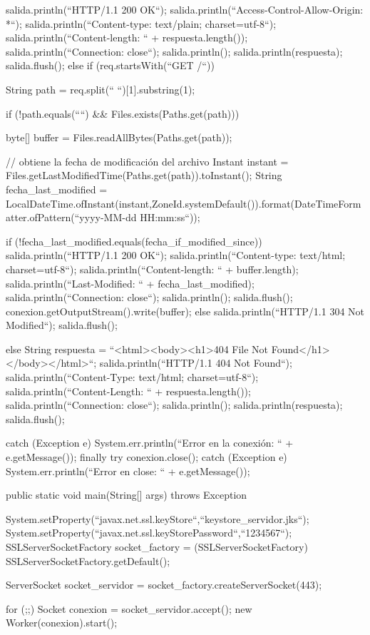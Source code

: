 \begin{SourceCode}
{{{{{          salida.println(``HTTP/1.1 200 OK``);
          salida.println(``Access-Control-Allow-Origin: *``);
          salida.println(``Content-type: text/plain; charset=utf-8``);
          salida.println(``Content-length: `` + respuesta.length());
          salida.println(``Connection: close``);
          salida.println();
          salida.println(respuesta);
          salida.flush();
        }
        else
        if (req.startsWith(``GET /``))
        {
          String path = req.split(`` ``)[1].substring(1);

          if (!path.equals(````) && Files.exists(Paths.get(path)))
          {
            byte[] buffer = Files.readAllBytes(Paths.get(path));

            // obtiene la fecha de modificación del archivo
            Instant instant = Files.getLastModifiedTime(Paths.get(path)).toInstant();
            String fecha_last_modified = LocalDateTime.ofInstant(instant,ZoneId.systemDefault()).format(DateTimeFormatter.ofPattern(``yyyy-MM-dd HH:mm:ss``));

            if (!fecha_last_modified.equals(fecha_if_modified_since))
            {
              salida.println(``HTTP/1.1 200 OK``);
              salida.println(``Content-type: text/html; charset=utf-8``);
              salida.println(``Content-length: `` + buffer.length);
              salida.println(``Last-Modified: `` + fecha_last_modified);
              salida.println(``Connection: close``);
              salida.println();
              salida.flush();
	            conexion.getOutputStream().write(buffer);
            }
            else
            {
              salida.println(``HTTP/1.1 304 Not Modified``);
              salida.flush();
            }
          }
          else
          {
            String respuesta = ``<html><body><h1>404 File Not Found</h1></body></html>``;
            salida.println(``HTTP/1.1 404 Not Found``);
            salida.println(``Content-Type: text/html; charset=utf-8``);
            salida.println(``Content-Length: `` + respuesta.length());
            salida.println(``Connection: close``);
            salida.println();
            salida.println(respuesta);
            salida.flush();
          }
        }
      }
      catch (Exception e)
      {
        System.err.println(``Error en la conexión: `` + e.getMessage());
      }
      finally
      {
        try
        {
          conexion.close();
        }
        catch (Exception e)
        {
          System.err.println(``Error en close: `` + e.getMessage());
        }
      }
    }
  }

  public static void main(String[] args) throws Exception
  {
    System.setProperty(``javax.net.ssl.keyStore``,``keystore_servidor.jks``);
    System.setProperty(``javax.net.ssl.keyStorePassword``,``1234567``);
    SSLServerSocketFactory socket_factory = (SSLServerSocketFactory) SSLServerSocketFactory.getDefault();

    ServerSocket socket_servidor = socket_factory.createServerSocket(443);

    for (;;)
    {
      Socket conexion = socket_servidor.accept();
      new Worker(conexion).start();
    }
  }
}
\end{SourceCode}

